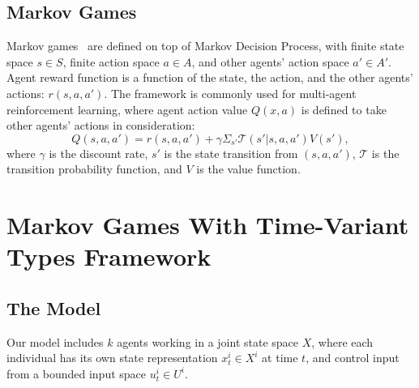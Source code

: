 \documentclass[letterpaper, 10 pt, conference]{ieeeconf}  %
\begin{document}

\vspace{-.2em}
\subsection{Markov Games}
\vspace{-.2em}
Markov games~\cite{littman1994markov} are defined on top of Markov Decision Process, with finite state space $s \in S$, finite action space $a \in A$, and other agents' action space 
$a' \in A'$.  Agent reward function is a function of the state, the action, and the other agents' actions: $r(s,a,a')$. The framework is commonly used for multi-agent reinforcement 
learning, where agent action value $Q(x,a)$ is defined to take other agents' 
actions in consideration:
\begin{equation}
  Q(s,a,a') = r(s,a,a') + \gamma \Sigma_{s'}\mathcal{T}(s'|s,a,a')V(s'),
\end{equation}
where $\gamma$ is the discount rate, $s'$ is the state transition from 
$(s,a,a')$, $\mathcal{T}$ is the transition probability function, and $V$ is the value 
function.

\section{Markov Games With Time-Variant Types Framework}
\subsection{The Model}
Our model includes $k$ agents working in a joint state space $X$, where each individual has its own state representation $x_t^i \in X^i$ at time $t$, and control input from a bounded 
input space $u_t^i \in U^i$. 
\end{document}
